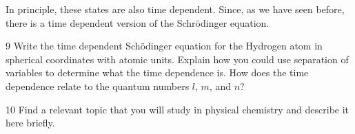 \documentclass{article}
\begin{document}
\noindent In principle, these states are also time dependent.  Since, as we have seen before, there is a time dependent version of the Schr\"odinger equation. 

\begin{problem}{}{9}
Write the time dependent Sch\"odinger equation for the Hydrogen atom in spherical coordinates with atomic units. Explain how you could use separation of variables to determine what the time dependence is.  How does the time dependence relate to the quantum numbers $l$, $m$, and $n$?
\end{problem}

\begin{problem}{}{10}
Find a relevant topic that you will study in physical chemistry and describe it here briefly.
\end{problem}
\end{document}
